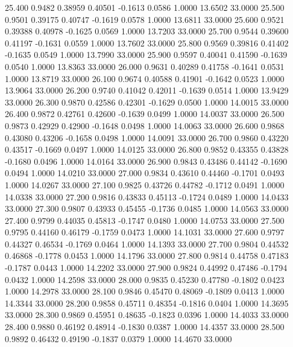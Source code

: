   25.400   0.9482   0.38959   0.40501  -0.1613   0.0586   1.0000  13.6502  33.0000
  25.500   0.9501   0.39175   0.40747  -0.1619   0.0578   1.0000  13.6811  33.0000
  25.600   0.9521   0.39388   0.40978  -0.1625   0.0569   1.0000  13.7203  33.0000
  25.700   0.9544   0.39600   0.41197  -0.1631   0.0559   1.0000  13.7602  33.0000
  25.800   0.9569   0.39816   0.41402  -0.1635   0.0549   1.0000  13.7990  33.0000
  25.900   0.9597   0.40041   0.41590  -0.1639   0.0540   1.0000  13.8363  33.0000
  26.000   0.9631   0.40289   0.41758  -0.1641   0.0531   1.0000  13.8719  33.0000
  26.100   0.9674   0.40588   0.41901  -0.1642   0.0523   1.0000  13.9064  33.0000
  26.200   0.9740   0.41042   0.42011  -0.1639   0.0514   1.0000  13.9429  33.0000
  26.300   0.9870   0.42586   0.42301  -0.1629   0.0500   1.0000  14.0015  33.0000
  26.400   0.9872   0.42761   0.42600  -0.1639   0.0499   1.0000  14.0037  33.0000
  26.500   0.9873   0.42929   0.42900  -0.1648   0.0498   1.0000  14.0063  33.0000
  26.600   0.9868   0.43080   0.43206  -0.1658   0.0498   1.0000  14.0091  33.0000
  26.700   0.9860   0.43220   0.43517  -0.1669   0.0497   1.0000  14.0125  33.0000
  26.800   0.9852   0.43355   0.43828  -0.1680   0.0496   1.0000  14.0164  33.0000
  26.900   0.9843   0.43486   0.44142  -0.1690   0.0494   1.0000  14.0210  33.0000
  27.000   0.9834   0.43610   0.44460  -0.1701   0.0493   1.0000  14.0267  33.0000
  27.100   0.9825   0.43726   0.44782  -0.1712   0.0491   1.0000  14.0338  33.0000
  27.200   0.9816   0.43833   0.45113  -0.1724   0.0489   1.0000  14.0433  33.0000
  27.300   0.9807   0.43933   0.45455  -0.1736   0.0485   1.0000  14.0563  33.0000
  27.400   0.9799   0.44035   0.45813  -0.1747   0.0480   1.0000  14.0753  33.0000
  27.500   0.9795   0.44160   0.46179  -0.1759   0.0473   1.0000  14.1031  33.0000
  27.600   0.9797   0.44327   0.46534  -0.1769   0.0464   1.0000  14.1393  33.0000
  27.700   0.9804   0.44532   0.46868  -0.1778   0.0453   1.0000  14.1796  33.0000
  27.800   0.9814   0.44758   0.47183  -0.1787   0.0443   1.0000  14.2202  33.0000
  27.900   0.9824   0.44992   0.47486  -0.1794   0.0432   1.0000  14.2598  33.0000
  28.000   0.9835   0.45230   0.47780  -0.1802   0.0423   1.0000  14.2978  33.0000
  28.100   0.9846   0.45470   0.48069  -0.1809   0.0413   1.0000  14.3344  33.0000
  28.200   0.9858   0.45711   0.48354  -0.1816   0.0404   1.0000  14.3695  33.0000
  28.300   0.9869   0.45951   0.48635  -0.1823   0.0396   1.0000  14.4033  33.0000
  28.400   0.9880   0.46192   0.48914  -0.1830   0.0387   1.0000  14.4357  33.0000
  28.500   0.9892   0.46432   0.49190  -0.1837   0.0379   1.0000  14.4670  33.0000
